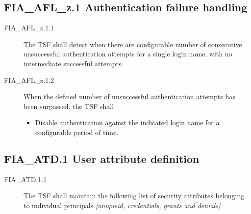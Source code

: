 \documentclass[10pt,a4paper,english]{scrbook}
\begin{document}
\subsection{FIA{\_}AFL{\_}z.1 Authentication failure handling}
\begin{description}
\item[FIA{\_}AFL{\_}z.1.1]

The TSF shall detect when there are configurable number of consecutive
unsuccessful authentication attempts for a single login name,
with no intermediate successful attempts.

\item[FIA{\_}AFL{\_}z.1.2 ]

When the defined number of unsuccessful authentication attempts
has been surpassed, the TSF shall
\begin{itemize}
\item {} 
Disable authentication against the indicated login name for a
configurable period of time.

\end{itemize}

\end{description}



\hypertarget{fia-atd-1-user-attribute-definition}{}
\subsection{FIA{\_}ATD.1 User attribute definition}
\begin{description}
\item[FIA{\_}ATD.1.1 ]

The TSF shall maintain the following list of security attributes
belonging to individual principals \emph{{[}uniqueid, credentials, grants
and denials]}

\end{description}


\end{document}
